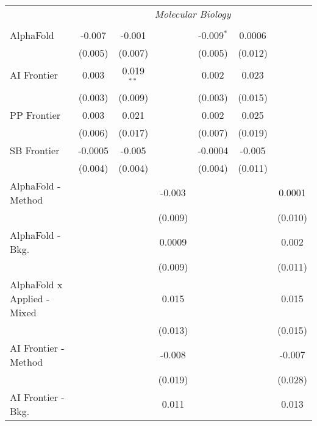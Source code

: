 \begin{tabular}{lcccccc}
 & \multicolumn{6}{c}{\textit{Molecular Biology}} \\ \\
   AlphaFold                     & -0.007  & -0.001       &               & -0.009$^{*}$ & 0.0006  &   \\   
                                 & (0.005) & (0.007)      &               & (0.005)      & (0.012) &   \\   
   AI Frontier                   & 0.003   & 0.019$^{**}$ &               & 0.002        & 0.023   &   \\   
                                 & (0.003) & (0.009)      &               & (0.003)      & (0.015) &   \\   
   PP Frontier                   & 0.003   & 0.021        &               & 0.002        & 0.025   &   \\   
                                 & (0.006) & (0.017)      &               & (0.007)      & (0.019) &   \\   
   SB Frontier                   & -0.0005 & -0.005       &               & -0.0004      & -0.005  &   \\   
                                 & (0.004) & (0.004)      &               & (0.004)      & (0.011) &   \\   
   AlphaFold - Method            &         &              & -0.003        &              &         & 0.0001\\   
                                 &         &              & (0.009)       &              &         & (0.010)\\   
   AlphaFold - Bkg.              &         &              & 0.0009        &              &         & 0.002\\   
                                 &         &              & (0.009)       &              &         & (0.011)\\   
   AlphaFold x Applied - Mixed   &         &              & 0.015         &              &         & 0.015\\   
                                 &         &              & (0.013)       &              &         & (0.015)\\   
   AI Frontier - Method          &         &              & -0.008        &              &         & -0.007\\   
                                 &         &              & (0.019)       &              &         & (0.028)\\   
   AI Frontier - Bkg.            &         &              & 0.011         &              &         & 0.013\\   

\end{tabular}
